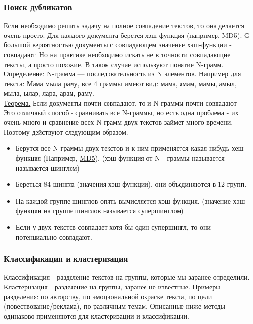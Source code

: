 \subsubsection {Поиск дубликатов}
Если необходимо решить задачу на полное совпадение текстов, то она делается очень просто. Для каждого документа берется хэш-функция (например, MD5). С большой вероятностью документы с совпадающем значение хэш-функции - совпадают. Но на практике необходимо искать не в точности совпадающие тексты, а просто похожие. В таком случае используют понятие N-грамм.  \\
\underline {Определение:} N-грамма — последовательность из N элементов. Например для текста: Мама мыла раму, все 4 граммы имеют вид: мама, амам, мамы, амыл, мыла, ылар, лара, арам, раму.  \\
\underline {Теорема.} Если документы почти совпадают, то и N-граммы почти совпадают\\
Это отличный способ - сравнивать все N-граммы, но есть одна проблема - их очень много и сравнение всех N-грамм двух текстов займет много времени. Поэтому действуют следующим образом.

\begin {itemize}
\item Берутся все N-граммы двух текстов и к ним применяется какая-нибудь хеш-функция (Например, \href{https://clck.ru/9cRa4}{MD5}). (хэш-функция от N - граммы называется называется шинглом)
\item Береться 84 шингла (значения хэш-функции), они объединяются в 12 групп.
\item На каждой группе шинглов опять вычисляется хэш-функция. (значение хэш функции на группе шинглов называется супершинглом)
\item Если у двух текстов совпадает хотя бы один супершингл,  то они потенциально совпадают.
\end {itemize}

\subsubsection {Классификация и кластеризация}
Классификация - разделение текстов на группы, которые мы заранее определили. Кластеризация - разделение на группы, заранее не известные.
Примеры разделения: по авторству, по эмоциональной окраске текста, по цели (повествование/реклама), по различным темам.
Описанные ниже методы одинаково применяются для кластеризации и классификации.

